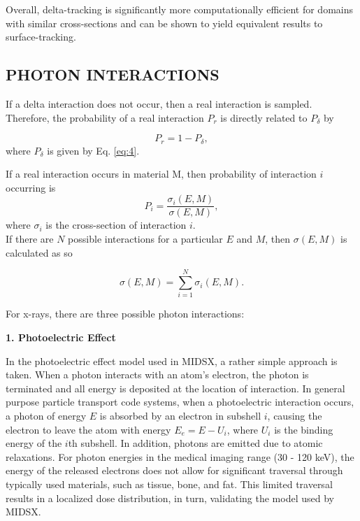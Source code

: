 \documentclass[%
 aip,
cp,  %
 amsmath,amssymb,%
reprint,%
]{revtex4-2}
\begin{document}
\par Overall, delta-tracking is significantly more computationally efficient for domains with similar cross-sections and can be shown to yield equivalent results to surface-tracking.

\subsection{PHOTON INTERACTIONS}
If a delta interaction does not occur, then a real interaction is sampled. Therefore, the probability of a real interaction $P_r$ is directly related to $P_\delta$ by

\begin{equation}
    P_r = 1 - P_\delta,
\end{equation}
where $P_\delta$ is given by Eq. \ref{eq:4}.
\\
\par If a real interaction occurs in material M, then probability of interaction $i$ occurring is
\begin{equation}
    P_i = \frac{\sigma_i(E, M)}{\sigma (E, M)},
\end{equation}
where $\sigma_i$ is the cross-section of interaction $i$.\\

If there are $N$ possible interactions for a particular $E$ and $M$, then $\sigma (E, M)$ is calculated as so

\begin{equation}
    \sigma (E, M) = \sum_{i=1}^{N} \sigma_i(E, M).
\end{equation}


\par For x-rays, there are three possible photon interactions: \\

\begin{large}
    \bf{1. Photoelectric Effect}
\end{large}

\par In the photoelectric effect model used in MIDSX, a rather simple approach is taken. When a photon interacts with an atom's electron, the photon is terminated and all energy is deposited at the location of interaction. In general purpose particle transport code systems, when a photoelectric interaction occurs, a photon of energy $E$ is absorbed by an electron in subshell $i$, causing the electron to leave the atom with energy $E_e = E - U_i$, where $U_i$ is the binding energy of the $i$th subshell. In addition, photons are emitted due to atomic relaxations. For photon energies in the medical imaging range (30 - 120 keV), the energy of the released electrons does not allow for significant traversal through typically used materials, such as tissue, bone, and fat. This limited traversal results in a localized dose distribution, in turn, validating the model used by MIDSX. \\
\end{document}
